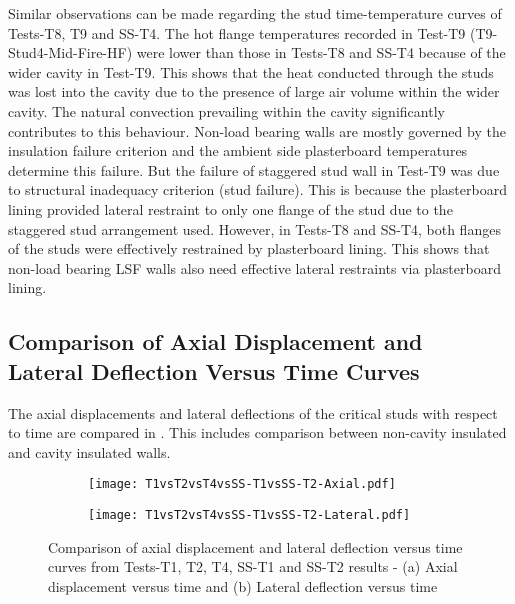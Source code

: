 Similar observations can be made regarding the stud time-temperature curves of Tests-T8, T9 and SS-T4. The hot flange temperatures recorded in Test-T9 (T9-Stud4-Mid-Fire-HF) were lower than those in Tests-T8 and SS-T4 because of the wider cavity in Test-T9. This shows that the heat conducted through the studs was lost into the cavity due to the presence of large air volume within the wider cavity. The natural convection prevailing within the cavity significantly contributes to this behaviour. Non-load bearing walls are mostly governed by the insulation failure criterion and the ambient side plasterboard temperatures determine this failure. But the failure of staggered stud wall in Test-T9 was due to structural inadequacy criterion (stud failure). This is because the plasterboard lining provided lateral restraint to only one flange of the stud due to the staggered stud arrangement used. However, in Tests-T8 and SS-T4, both flanges of the studs were effectively restrained by plasterboard lining. This shows that non-load bearing LSF walls also need effective lateral restraints via plasterboard lining.

\subsection[Comparison of Axial Displacement and Lateral Deflection Versus Time Curves]{Comparison of Axial Displacement and \\Lateral Deflection Versus Time Curves}

The axial displacements and lateral deflections of the critical studs with respect to time are compared in . This includes comparison between non-cavity insulated and cavity insulated walls. 
\begin{figure}[!htbp]
	\centering
	\begin{subfigure}[b]{0.7\textwidth}
		\centering
		\texttt{[image: T1vsT2vsT4vsSS-T1vsSS-T2-Axial.pdf]}
		\caption{}
		\label{subfig:T1vsT2vsT4vsSS-T1vsSS-T2-Axial}
	\end{subfigure}
	\begin{subfigure}[b]{0.7\textwidth}
		\centering
		\texttt{[image: T1vsT2vsT4vsSS-T1vsSS-T2-Lateral.pdf]}
		\caption{}
		\label{subfig:T1vsT2vsT4vsSS-T1vsSS-T2-Lateral}
	\end{subfigure}
	   \caption{Comparison of axial displacement and lateral deflection versus time curves from Tests-T1, T2, T4, SS-T1 and SS-T2 results - (a) Axial displacement versus time and (b) Lateral deflection versus time}
	   \label{fig:T1vsT2vsT4vsSS-T1vsSS-T2-Displacement}
\end{figure}

